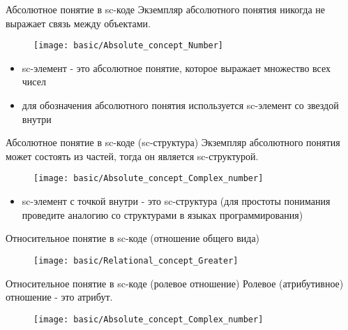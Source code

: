 \begin{frame}{Абсолютное понятие в sc-коде}
  Экземпляр абсолютного понятия никогда не выражает связь между объектами.
  
  \begin{center}
    \begin{figure}
      \texttt{[image: basic/Absolute\_concept\_Number]}
    \end{figure}
  \end{center}

  \begin{itemize}
  \item sc-элемент  - это абсолютное понятие, которое
    выражает множество всех чисел
  \item для обозначения абсолютного понятия используется sc-элемент со
    звездой внутри
  \end{itemize}
\end{frame}

\begin{frame}{Абсолютное понятие в sc-коде (sc-структура)}
  Экземпляр абсолютного понятия может состоять из частей, тогда он
  является sc-структурой.
  
  \begin{center}
    \begin{figure}
      \texttt{[image: basic/Absolute\_concept\_Complex\_number]}
    \end{figure}
  \end{center}

  \begin{itemize}
  \item sc-элемент с точкой внутри - это sc-структура (для простоты
    понимания проведите аналогию со структурами в языках
    программирования)
  \end{itemize}
\end{frame}

\begin{frame}{Относительное понятие в sc-коде (отношение общего вида)}
  \begin{center}
    \begin{figure}
      \texttt{[image: basic/Relational\_concept\_Greater]}
    \end{figure}
  \end{center}
\end{frame}

\begin{frame}{Относительное понятие в sc-коде (ролевое отношение)}
  Ролевое (атрибутивное) отношение - это атрибут.

  \begin{center}
    \begin{figure}
      \texttt{[image: basic/Absolute\_concept\_Complex\_number]}
    \end{figure}
  \end{center}
\end{frame}


